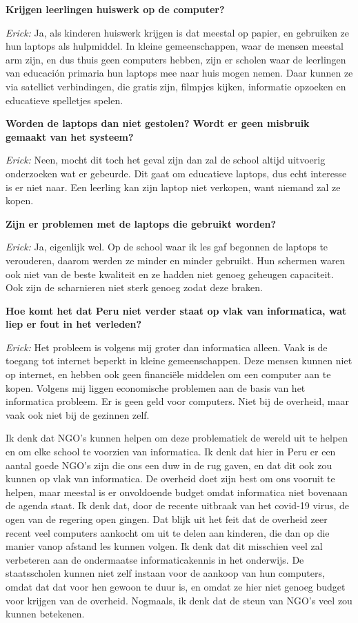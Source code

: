 \textbf{Krijgen leerlingen huiswerk op de computer?}

\textit{Erick:} Ja, als kinderen huiswerk krijgen is dat meestal op papier, en gebruiken ze hun laptops als hulpmiddel. In kleine gemeenschappen, waar de mensen meestal arm zijn, en dus thuis geen computers hebben, zijn er scholen waar de leerlingen van educación primaria hun laptops mee naar huis mogen nemen. Daar kunnen ze via satelliet verbindingen, die gratis zijn, filmpjes kijken, informatie opzoeken en educatieve spelletjes spelen. 

\textbf{Worden de laptops dan niet gestolen? Wordt er geen misbruik gemaakt van het systeem?}

\textit{Erick:} Neen, mocht dit toch het geval zijn dan zal de school altijd uitvoerig onderzoeken wat er gebeurde. Dit gaat om educatieve laptops, dus echt interesse is er niet naar. Een leerling kan zijn laptop niet verkopen, want niemand zal ze kopen. 

\textbf{Zijn er problemen met de laptops die gebruikt worden?}

\textit{Erick:} Ja, eigenlijk wel. Op de school waar ik les gaf begonnen de laptops te verouderen, daarom werden ze minder en minder gebruikt. Hun schermen waren ook niet van de beste kwaliteit en ze hadden niet genoeg geheugen capaciteit. Ook zijn de scharnieren niet sterk genoeg zodat deze braken.

\textbf{Hoe komt het dat Peru niet verder staat op vlak van informatica, wat liep er fout in het verleden?}

\textit{Erick:} Het probleem is volgens mij groter dan informatica alleen. Vaak is de toegang tot internet beperkt in kleine gemeenschappen. Deze mensen kunnen niet op internet, en hebben ook geen financiële middelen om een computer aan te kopen. Volgens mij liggen economische problemen aan de basis van het informatica probleem. Er is geen geld voor computers. Niet bij de overheid, maar vaak ook niet bij de gezinnen zelf. 

Ik denk dat NGO's kunnen helpen om deze problematiek de wereld uit te helpen en om elke school te voorzien van informatica. Ik denk dat hier in Peru er een aantal goede NGO's zijn die ons een duw in de rug gaven, en dat dit ook zou kunnen op vlak van informatica. De overheid doet zijn best om ons vooruit te helpen, maar meestal is er onvoldoende budget omdat informatica niet bovenaan de agenda staat. Ik denk dat, door de recente uitbraak van het covid-19 virus, de ogen van de regering open gingen. Dat blijk uit het feit dat de overheid zeer recent veel computers aankocht om uit te delen aan kinderen, die dan op die manier vanop afstand les kunnen volgen. Ik denk dat dit misschien veel zal verbeteren aan de ondermaatse informaticakennis in het onderwijs. De staatsscholen kunnen niet zelf instaan voor de aankoop van hun computers, omdat dat dat voor hen gewoon te duur is, en omdat ze hier niet genoeg budget voor krijgen van de overheid. Nogmaals, ik denk dat de steun van NGO's veel zou kunnen betekenen.


